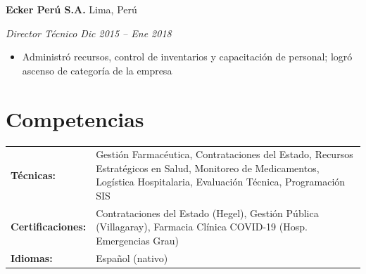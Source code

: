 \documentclass[10.5pt,letterpaper]{article}
\newcommand{\entry}[4]{%
  \noindent\textbf{#1} \hfill #2 \par\nopagebreak
  \textit{#3} \hfill \textit{#4} \par\nopagebreak
}
\begin{document}
\entry{Ecker Per\'u S.A.}{Lima, Per\'u}{Director T\'ecnico}{Dic 2015 -- Ene 2018}
\begin{itemize}
  \item Administr\'o recursos, control de inventarios y capacitaci\'on de personal; logr\'o ascenso de categor\'ia de la empresa
\end{itemize}
\vspace{0.3em}

\section{Competencias}

\begin{tabularx}{\textwidth}{@{}l X@{}}
\textbf{T\'ecnicas:} & Gesti\'on Farmac\'eutica, Contrataciones del Estado, Recursos Estrat\'egicos en Salud, Monitoreo de Medicamentos, Log\'istica Hospitalaria, Evaluaci\'on T\'ecnica, Programaci\'on SIS \\[3pt]
\textbf{Certificaciones:} & Contrataciones del Estado (Hegel), Gesti\'on P\'ublica (Villagaray), Farmacia Cl\'inica COVID-19 (Hosp. Emergencias Grau) \\[3pt]
\textbf{Idiomas:} & Espa\~nol (nativo) \\
\end{tabularx}
\end{document}
